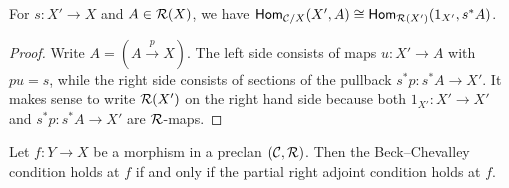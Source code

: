 \begin{lemma} \label{lem:pullback-global-sections}
  For $s : X' \to X$ and $A \in \mathcal{R}(X)$, we have
  $\mathsf{Hom}_{\mathcal{C}/X}(X', A) \cong \mathsf{Hom}_{\mathcal{R}(X')}(1_{X'}, s^* A)$.
\end{lemma}
\begin{proof}
  Write $A = (A \xrightarrow{p} X)$.
  The left side consists of maps $u : X' \to A$ with $pu = s$,
  while the right side consists of sections of the pullback $s^* p : s^* A \to X'$.
  It makes sense to write $\mathcal{R}(X')$ on the right hand side
  because both $1_{X'} : X' \to X'$ and $s^* p : s^* A \to X'$ are $\mathcal{R}$-maps.
\end{proof}

\begin{proposition} \label{prop:beck-chevalley-defs}
  Let $f : Y \to X$ be a morphism in a preclan $(\mathcal{C},\mathcal{R})$.
  Then the Beck--Chevalley condition holds at $f$ if and only if
  the partial right adjoint condition holds at $f$.
\end{proposition}
